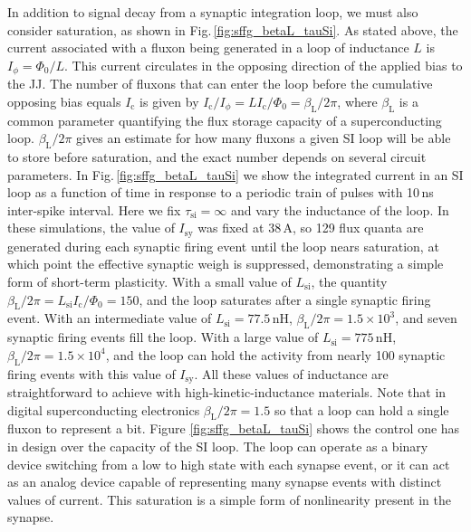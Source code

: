 \documentclass[twocolumn]{article}
\begin{document}
In addition to signal decay from a synaptic integration loop, we must also consider saturation, as shown in Fig.\,\ref{fig:sffg_betaL_tauSi}. As stated above, the current associated with a fluxon being generated in a loop of inductance $L$ is $I_{\phi} = \Phi_0/L$. This current circulates in the opposing direction of the applied bias to the JJ. The number of fluxons that can enter the loop before the cumulative opposing bias equals $I_{\mathrm{c}}$ is given by $I_{\mathrm{c}}/I_{\phi} = L I_{\mathrm{c}}/\Phi_0 = \beta_{\mathrm{L}}/2 \pi$, where $\beta_{\mathrm{L}}$ is a common parameter quantifying the flux storage capacity of a superconducting loop. $\beta_{\mathrm{L}}/2\pi$ gives an estimate for how many fluxons a given SI loop will be able to store before saturation, and the exact number depends on several circuit parameters. In Fig.\,\ref{fig:sffg_betaL_tauSi} we show the integrated current in an SI loop as a function of time in response to a periodic train of pulses with 10\,ns inter-spike interval. Here we fix $\tau_{\mathrm{si}} = \infty$ and vary the inductance of the loop. In these simulations, the value of $I_{\mathrm{sy}}$ was fixed at 38\,\textmu A, so 129 flux quanta are generated during each synaptic firing event until the loop nears saturation, at which point the effective synaptic weigh is suppressed, demonstrating a simple form of short-term plasticity. With a small value of $L_{\mathrm{si}}$, the quantity $\beta_{\mathrm{L}}/2\pi = L_{\mathrm{si}} I_{\mathrm{c}}/\Phi_0 =  150$, and the loop saturates after a single synaptic firing event. With an intermediate value of $L_{\mathrm{si}} = 77.5$\,nH, $\beta_{\mathrm{L}}/2\pi = 1.5\times 10^3$, and seven synaptic firing events fill the loop. With a large value of $L_{\mathrm{si}} = 775$\,nH, $\beta_{\mathrm{L}}/2\pi = 1.5\times 10^{4}$, and the loop can hold the activity from nearly 100 synaptic firing events with this value of $I_{\mathrm{sy}}$. All these values of inductance are straightforward to achieve with high-kinetic-inductance materials. Note that in digital superconducting electronics $\beta_{\mathrm{L}}/2\pi = 1.5$ so that a loop can hold a single fluxon to represent a bit. Figure \ref{fig:sffg_betaL_tauSi} shows the control one has in design over the capacity of the SI loop. The loop can operate as a binary device switching from a low to high state with each synapse event, or it can act as an analog device capable of representing many synapse events with distinct values of current. This saturation is a simple form of nonlinearity present in the synapse. 
\end{document}
